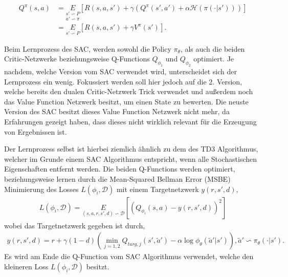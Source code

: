 \documentclass[]{iat}
\begin{document}
\begin{align}
    Q^{\pi}(s,a) & = \underset{a' \backsim \pi}{\underset{s' \backsim P}{E}} \left[R(s, a, s') + \gamma (Q^{\pi}(s', a') + \alpha \mathcal{H}(\pi(\cdot | s')))\right] \\
                 & = \underset{s' \backsim P}{E} \left[R(s,a,s') + \gamma V^{\pi}(s')\right]. \label{eq:bellmansac}
\end{align}

Beim Lernprozess des SAC, werden sowohl die Policy $\pi_{\theta}$, als auch die beiden Critic-Netzwerke beziehungsweise Q-Functions $Q_{\phi_1}$ und $Q_{\phi_2}$ optimiert. Je nachdem, welche Version vom SAC verwendet wird, unterscheidet sich der Lernprozess ein wenig. Fokussiert werden soll hier jedoch auf die 2. Version, welche bereits den dualen Critic-Netzwerk Trick verwendet und außerdem noch das Value Function Netzwerk besitzt, um einen State zu bewerten. Die neuste Version des SAC besitzt dieses Value Function Netzwerk nicht mehr, da Erfahrungen gezeigt haben, dass dieses nicht wirklich relevant für die Erzeugung von Ergebnissen ist. \cite[]{sacv3}

Der Lernprozess selbst ist hierbei ziemlich ähnlich zu dem des TD3 Algorithmus, welcher im Grunde einem SAC Algorithmus entspricht, wenn alle Stochastischen Eigenschaften entfernt werden. Die beiden Q-Functions werden optimiert, beziehungsweise lernen durch die Mean-Squared Bellman Error (MSBE) Minimierung des Losses $L(\phi_i, \mathcal{D})$ mit einem Targetnetzwerk $y(r, s', d)$,
\begin{align}
    L(\phi_i, \mathcal{D}) = \underset{(s, a, r, s', d) \backsim \mathcal{D}}{E}\left[\left(Q_{\phi_i}(s,a) - y(r, s', d)\right)^2 \right]
\end{align}
wobei das Targetnetzwerk gegeben ist durch,
\begin{align}
    y(r,s', d) = r+\gamma(1-d)\left(\min_{j=1,2}Q_{targ,j}(s', \widetilde{a}')-\alpha \log \phi_{\theta}(\widetilde{a}' | s')\right), \widetilde{a}'\backsim \pi_{\theta}(\cdot |s').
\end{align} \label{eq:target}
Es wird am Ende die Q-Function vom SAC Algorithmus verwendet, welche den kleineren Loss $L(\phi_i, \mathcal{D})$ besitzt.
\end{document}
